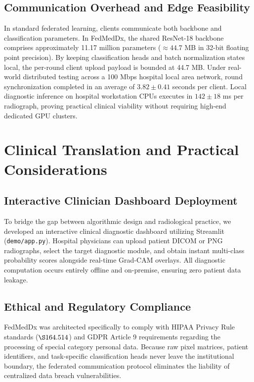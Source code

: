 \documentclass[conference]{IEEEtran}
\begin{document}
\subsection{Communication Overhead and Edge Feasibility}
In standard federated learning, clients communicate both backbone and classification parameters. In FedMedDx, the shared ResNet-18 backbone comprises approximately 11.17 million parameters ($\approx 44.7$ MB in 32-bit floating point precision). By keeping classification heads and batch normalization states local, the per-round client upload payload is bounded at 44.7 MB. Under real-world distributed testing across a 100 Mbps hospital local area network, round synchronization completed in an average of $3.82 \pm 0.41$ seconds per client. Local diagnostic inference on hospital workstation CPUs executes in $142 \pm 18$ ms per radiograph, proving practical clinical viability without requiring high-end dedicated GPU clusters.

\section{Clinical Translation and Practical Considerations}

\subsection{Interactive Clinician Dashboard Deployment}
To bridge the gap between algorithmic design and radiological practice, we developed an interactive clinical diagnostic dashboard utilizing Streamlit (\texttt{demo/app.py}). Hospital physicians can upload patient DICOM or PNG radiographs, select the target diagnostic module, and obtain instant multi-class probability scores alongside real-time Grad-CAM overlays. All diagnostic computation occurs entirely offline and on-premise, ensuring zero patient data leakage.

\subsection{Ethical and Regulatory Compliance}
FedMedDx was architected specifically to comply with HIPAA Privacy Rule standards ($\S 164.514$) and GDPR Article 9 requirements regarding the processing of special category personal data. Because raw pixel matrices, patient identifiers, and task-specific classification heads never leave the institutional boundary, the federated communication protocol eliminates the liability of centralized data breach vulnerabilities.
\end{document}
